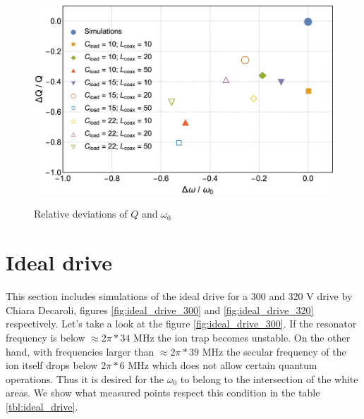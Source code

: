 \begin{figure}[h]
	\centering
	\includegraphics[width=\textwidth]{images/Q_w_plot}
	\label{fig:Q_w_deviation}
	\caption{Relative deviations of $Q$ and $\omega_0$}
\end{figure}

\section{Ideal drive}
This section includes simulations of the ideal drive for a 300 and 320 V drive by Chiara Decaroli, figures \ref{fig:ideal_drive_300} and \ref{fig:ideal_drive_320} respectively. Let's take a look at the figure \ref{fig:ideal_drive_300}. If the resonator frequency is below $\approx 2\pi*34$ MHz the ion trap becomes unstable. On the other hand, with frequencies larger than $\approx 2\pi*39$ MHz the secular frequency of the ion itself drops below $2\pi*6$ MHz which does not allow certain quantum operations. Thus it is desired for the $\omega_0$ to belong to the intersection of the white areas. We show what measured points respect this condition in the table \ref{tbl:ideal_drive}.

